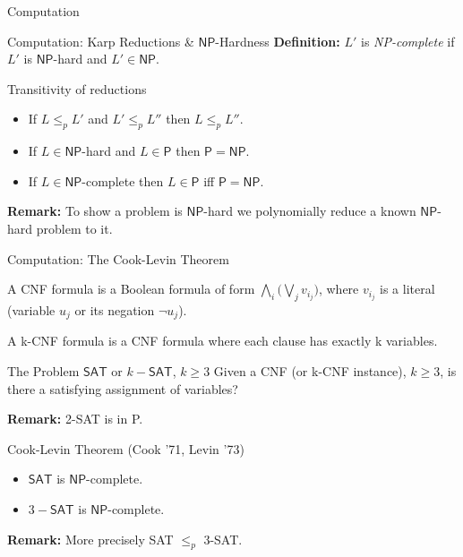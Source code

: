 \documentclass{beamer}
\begin{document}
\begin{section}{Computation}
\begin{frame}{Computation: Karp Reductions \& $\mathsf{NP}$-Hardness}
    \textbf{Definition:} $L'$ is \textit{NP-complete} if $L'$ is $\mathsf{NP}$-hard and $L'\in \mathsf{NP}$.
    
    \begin{block}{Transitivity of reductions}
    \begin{itemize}
        \item If $L\leq_p L'$ and $L' \leq_p L''$ then $L\leq_p L''$. 
        \item If $L\in \mathsf{NP}$-hard and $L\in \mathsf{P}$ then $\mathsf{P}=\mathsf{NP}$.
        \item If $L\in \mathsf{NP}$-complete then $L\in \mathsf{P}$ iff $\mathsf{P}=\mathsf{NP}$.
    \end{itemize}{}
    \end{block}
    \textbf{Remark:} To show a problem is $\mathsf{NP}$-hard we polynomially reduce a known $\mathsf{NP}$-hard problem to it.
\end{frame}

\begin{frame}{Computation: The Cook-Levin Theorem}

A CNF formula is a Boolean formula of form $\bigwedge_i \bigg(\bigvee_j v_{i_j} \bigg)$, where $v_{i_j}$ is a literal (variable $u_j$ or its negation $\neg u_j$). 

A k-CNF formula is a CNF formula where each clause has exactly k variables.

\begin{block}{The Problem $\mathsf{SAT}$ or $k-\mathsf{SAT}$, $k\geq 3$}
    Given a CNF (or k-CNF instance), $k\geq 3$, is there a satisfying assignment of variables?
\end{block}
\textbf{Remark:} 2-SAT is in P. 
\begin{block}{Cook-Levin Theorem (Cook '71, Levin '73)}
    \begin{itemize}
        \item $\mathsf{SAT}$ is $\mathsf{NP}$-complete.
        \item $3-\mathsf{SAT}$ is $\mathsf{NP}$-complete.
    \end{itemize}{}
\end{block}
\textbf{Remark:} More precisely SAT $\leq_p$ 3-SAT. 
\end{frame}

\end{section}
\end{document}
